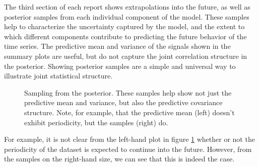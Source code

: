 \documentclass{article} %
\begin{document}
The third section of each report shows extrapolations into the future, as well as posterior samples from each individual component of the model.  These samples help to characterize the uncertainty captured by the model, and the extent to which different components contribute to predicting the future behavior of the time series.
%
The predictive mean and variance of the signals shown in the summary plots are useful, but do not capture the joint correlation structure in the posterior.  Showing posterior samples are a simple and universal way to illustrate joint statistical structure.
%
\begin{figure}[h!]
\centering
{}
\caption{Sampling from the posterior.  These samples help show not just the predictive mean and variance, but also the predictive covariance structure.  Note, for example, that the predictive mean (left) doesn't exhibit periodicity, but the samples (right) do.}
\label{fig:extrap-full}
\end{figure}
%
For example,
it is not clear from the left-hand plot in figure \ref{fig:extrap-full} whether or not the periodicity of the dataset is expected to continue into the future.  However, from the samples on the right-hand size, we can see that this is indeed the case.  

\end{document}
